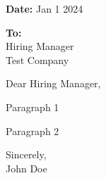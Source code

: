 \documentclass[letterpaper,11pt]{article}
\begin{document}
\pagestyle{empty}

\textbf{Date:} Jan 1 2024

\textbf{To:} \\
Hiring Manager \\
Test Company

Dear Hiring Manager,

Paragraph 1



Paragraph 2

Sincerely,\\
John Doe
\end{document}
